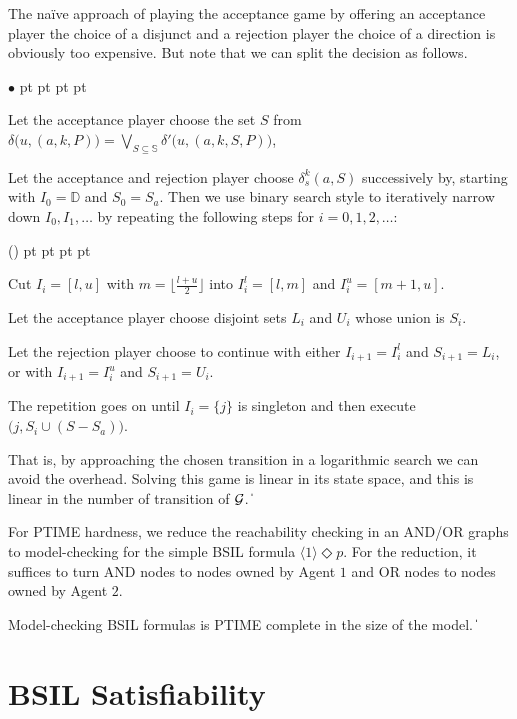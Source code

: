 \documentclass[11pt]{article}
\newcommand{\calg}{{\cal G}}
\newcommand{\pevt}{\Diamond}
\newcommand{\bbbbd}{{\mathbb D}}
\newcommand{\bbbbs}{{\mathbb S}}
\def\qed{\ifmmode\|\else{\unskip\nobreak\hfil
\penalty50\hskip1em\null\nobreak\hfil$\blacksquare$
\parfillskip=0pt\finalhyphendemerits=0\endgraf}\fi}
\newenvironment{list1}{\begin{list}{$\bullet$}
{\topsep 0 pt \parsep 0 pt \partopsep 0 pt \itemsep 0 pt}}{\end{list}}
\newcounter{sequent1}
\newcounter{sequent2}
\newcounter{sequent3}
\newcounter{sequent4}
\newenvironment{stmt1}{\begin{list}{(\arabic{sequent1})}
  {\usecounter{sequent1}
    \topsep 0 pt \parsep 2 pt \partopsep 0 pt \itemsep 0 pt
} }{\end{list}}
\begin{document}
The na\"ive approach of playing the acceptance game by 
offering an acceptance player the choice of a disjunct 
and a rejection player the choice of a direction is obviously too expensive. 
But note that we can split the decision as follows. 
\begin{list1}
\item Let the acceptance player choose the set $S$ 
  from $\delta\big(u,(a,k,P)\big) = 
  \bigvee_{S \subseteq \bbbbs}\delta'\big(u,(a,k,S,P)\big)$,
\item Let the acceptance and rejection player choose 
  $\delta_s^k(a,S)$ successively by, starting with 
  $I_0=\bbbbd$ and $S_0 = S_a$.  
  Then we use binary search style to iteratively 
  narrow down $I_0,I_1,\ldots$ by repeating the following steps for  
  $i=0,1,2,\ldots$:  
  \begin{stmt1}
  \item Cut $I_i = [l,u]$ with $m=\big\lfloor\frac{l+u}{2}\big\rfloor$ 
    into $I_i^l = [l,m]$ and $I_i^u = [m+1,u]$.   
  \item Let the acceptance player choose disjoint sets $L_i$ and $U_i$ 
    whose union is $S_i$.    
  \item Let the rejection player choose to continue 
    with either $I_{i+1}= I_i^l$ and $S_{i+1} = L_i$, 
    or with $I_{i+1}= I_i^u$ and $S_{i+1} = U_i$.  
  \end{stmt1}
  The repetition goes on until 
  $I_i =\{j\}$ is singleton and then execute 
  $\big(j,S_i \cup (S - S_a)\big)$.
\end{list1}
That is, by approaching the chosen transition in a logarithmic search we can avoid the overhead. Solving this game is linear in its state space, and this is linear in the number of transition of $\calg$.
\qed 





For PTIME hardness, we reduce the reachability checking 
in an AND/OR graphs \cite{Immerman81} to model-checking for the simple BSIL formula $\langle 1 \rangle \pevt p$.
For the reduction, it suffices to turn AND nodes to nodes owned by Agent $1$ and OR nodes to nodes owned by Agent $2$.

{\theorem\label{thm.aa.lb} 
Model-checking BSIL formulas is PTIME complete in the size of the model.
}
\qed 




\section{BSIL Satisfiability\label{sec.sat}} 
\end{document}
